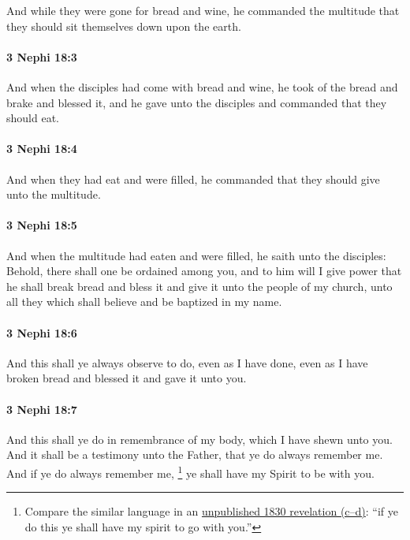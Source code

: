 			And while they were gone for bread and wine,
			he commanded the multitude
			that they should sit themselves down upon the earth.

		\paragraph{3 Nephi 18:3} %
			\label{3NEPHI-18-3}

			And when the disciples had come with bread and wine,
			he took of the bread and brake and blessed it,
			and he gave unto the disciples
			and commanded that they should eat.

		\paragraph{3 Nephi 18:4} %
			\label{3NEPHI-18-4}

			And when they had eat and were filled,
			he commanded that they should give unto the multitude.

		\paragraph{3 Nephi 18:5} %
			\label{3NEPHI-18-5}

			And when the multitude had eaten and were filled,
			he saith unto the disciples:
			Behold, there shall one be ordained among you,
			and to him will I give power that he shall break bread and bless it
			and give it unto the people of my church,
			unto all they which shall believe and be baptized in my name.

		\paragraph{3 Nephi 18:6} %
			\label{3NEPHI-18-6}

			And this shall ye always observe to do, even as I have done,
			even as I have broken bread and blessed it and gave it unto you.

		\paragraph{3 Nephi 18:7} %
			\label{3NEPHI-18-7}

			And this shall ye do in remembrance of my body, which I have shewn unto you.
			And it shall be a testimony unto the Father,
			that ye do always remember me.
			And if ye do always remember me,
				\footnote{%
					Compare the similar language in an \hyperlink{EMS-1830-JS-CIR-EARLY-1830-c}{unpublished 1830 revelation (c--d)}: ``if ye do this ye shall have my spirit to go with you.''
					}%
			ye shall have my Spirit to be with you.

